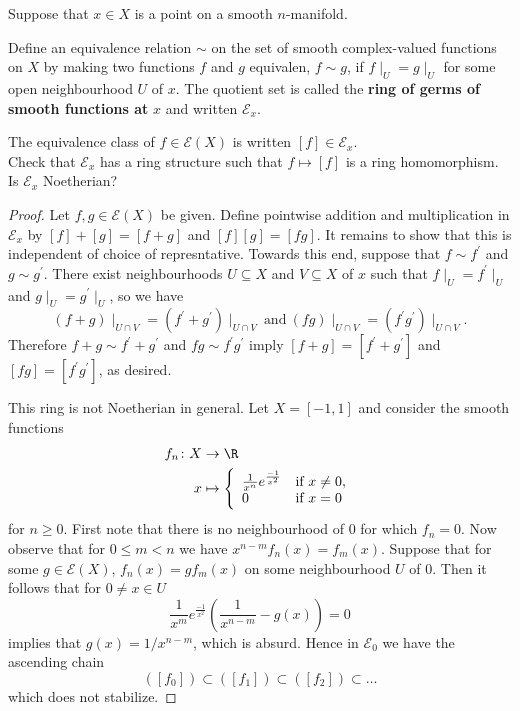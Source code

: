 \documentclass[10pt]{amsart}
\begin{document}
\begin{thm}\label{ex4}
  Suppose that $x \in X$ is a point on a smooth $n$-manifold.
  
  \begin{defn}
    Define an equivalence relation $\sim$ on the set of smooth complex-valued functions on $X$ by making two functions $f$ and $g$ equivalen, $f \sim g$, if $f\mid_U = g\mid_U$ for some open neighbourhood $U$ of $x$.
    The quotient set is called the {\bf ring of germs of smooth functions at} $x$ and written $\mathcal{E}_x$.

    The equivalence class of $f \in \mathcal{E}(X)$ is written $[f] \in \mathcal{E}_x$.\\

    Check that $\mathcal{E}_x$ has a ring structure such that $f \mapsto [f]$ is a ring homomorphism.
    Is $\mathcal{E}_x$ Noetherian?
  \end{defn}

  \begin{proof}
    Let $f, g \in \mathcal{E}(X)$ be given.
    Define pointwise addition and multiplication in $\mathcal{E}_x$ by $[f] + [g] = [f + g]$ and $[f][g] = [fg]$.
    It remains to show that this is independent of choice of represntative.
    Towards this end, suppose that $f \sim f^\prime$ and $g \sim g^\prime$.
    There exist neighbourhoods $U \subseteq X$ and $V \subseteq X$ of $x$ such that $f\mid_U = f^\prime\mid_U$ and $g\mid_U = g^\prime\mid_U$, so we have
    $$(f + g)\mid_{U \cap V} = (f^\prime + g^\prime)\mid_{U \cap V}\ \text{and}\ (fg)\mid_{U \cap V} = (f^\prime g^\prime)\mid_{U \cap V}.$$
    Therefore $f + g \sim f^\prime + g^\prime$ and $fg \sim f^\prime g^\prime$ imply $[f + g] = [f^\prime + g^\prime]$ and $[fg] = [f^\prime g^\prime]$, as desired.		

    This ring is not Noetherian in general.
    Let $X = [-1,1]$ and consider the smooth functions
    \begin{align*}
      f_n \colon X &\rightarrow \R\\
      x &\mapsto \left\{
      \begin{array}{ll}
	\frac{1}{x^n}e^\frac{-1}{x^2} & \text{if}\ x \neq 0,\\ 
	0 & \text{if}\ x = 0
      \end{array}
      \right.
    \end{align*}
    for $n \geq 0$.
    First note that there is no neighbourhood of $0$ for which $f_n = 0$.
    Now observe that for $0 \leq m < n$ we have $x^{n-m}f_n(x) = f_m(x)$.
    Suppose that for some $g \in \mathcal{E}(X)$, $f_n(x) = gf_m(x)$ on some neighbourhood $U$ of $0$.
    Then it follows that for $0 \neq x \in U$
    $$\frac{1}{x^m}e^\frac{-1}{x^2}\left(\frac{1}{x^{n-m}} - g(x)\right) = 0$$
    implies that $g(x) = 1/x^{n-m}$, which is absurd.
    Hence in $\mathcal{E}_0$ we have the ascending chain
    $$([f_0]) \subset ([f_1]) \subset ([f_2]) \subset \ldots$$
    which does not stabilize.
  \end{proof}
\end{thm}
\end{document}

